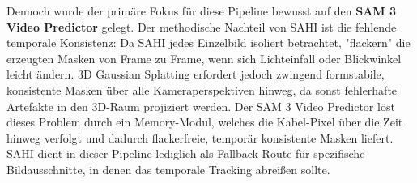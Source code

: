\documentclass[12pt,a4paper]{article}
\begin{document}
Dennoch wurde der primäre Fokus für diese Pipeline bewusst auf den \textbf{SAM 3 Video Predictor} gelegt. Der methodische Nachteil von SAHI ist die fehlende temporale Konsistenz: Da SAHI jedes Einzelbild isoliert betrachtet, "flackern" die erzeugten Masken von Frame zu Frame, wenn sich Lichteinfall oder Blickwinkel leicht ändern. 3D Gaussian Splatting erfordert jedoch zwingend formstabile, konsistente Masken über alle Kameraperspektiven hinweg, da sonst fehlerhafte Artefakte in den 3D-Raum projiziert werden. Der SAM 3 Video Predictor löst dieses Problem durch ein Memory-Modul, welches die Kabel-Pixel über die Zeit hinweg verfolgt und dadurch flackerfreie, temporär konsistente Masken liefert. SAHI dient in dieser Pipeline lediglich als Fallback-Route für spezifische Bildausschnitte, in denen das temporale Tracking abreißen sollte.
\end{document}
